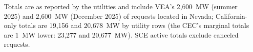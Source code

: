 \footnotesize Totals are as reported by the utilities and include VEA's 2,600~MW (summer 2025) and 2,600~MW (December 2025) of requests located in Nevada; California-only totals are 19,156 and 20,678~MW by utility rows (the CEC's marginal totals are 1~MW lower: 23,277 and 20,677~MW). SCE active totals exclude canceled requests.